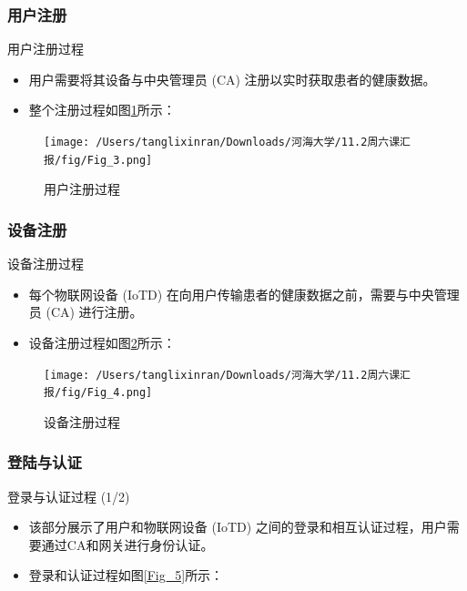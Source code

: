 \documentclass{beamer}
\begin{document}
\subsubsection{用户注册}
\begin{frame}{用户注册过程}
    \begin{itemize}
        \item 用户需要将其设备与中央管理员 (CA) 注册以实时获取患者的健康数据。
        \item 整个注册过程如图\ref{Fig_3}所示：
    \end{itemize}
       
    \begin{figure}
        \centering
        \texttt{[image: /Users/tanglixinran/Downloads/河海大学/11.2周六课汇报/fig/Fig\_3.png]} %
        \caption{用户注册过程}
        \label{Fig_3}
    \end{figure}
\end{frame}



\subsubsection{设备注册}
\begin{frame}{设备注册过程}
    \begin{itemize}
        \item 每个物联网设备 (IoTD) 在向用户传输患者的健康数据之前，需要与中央管理员 (CA) 进行注册。
        \item 设备注册过程如图\ref{Fig_4}所示：
    \end{itemize}

    \begin{figure}
        \centering
        \texttt{[image: /Users/tanglixinran/Downloads/河海大学/11.2周六课汇报/fig/Fig\_4.png]} %
        \vspace{-0.3cm}  %
        \caption{设备注册过程}
        \label{Fig_4}
    \end{figure}
\end{frame}


\subsubsection{登陆与认证}
\begin{frame}{登录与认证过程 (1/2)}
    \begin{itemize}
        \item 该部分展示了用户和物联网设备 (IoTD) 之间的登录和相互认证过程，用户需要通过CA和网关进行身份认证。
        \item 登录和认证过程如图\ref{Fig_5}所示：
    \end{itemize}
\end{frame}
\end{document}
